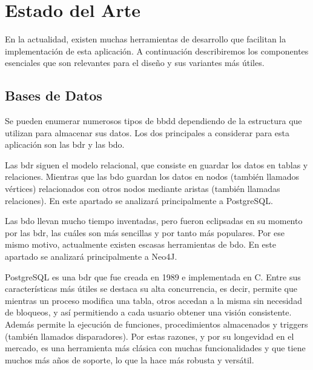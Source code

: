   
\chapter{Estado del Arte\label{CAP:ESTADOARTE}}
  En la actualidad, existen muchas herramientas de desarrollo que facilitan la implementación de esta aplicación. A continuación describiremos los componentes esenciales que son relevantes para el diseño y sus variantes más útiles.
  
  \section{Bases de Datos}
    Se pueden enumerar numerosos tipos de \ac{bbdd} dependiendo de la estructura que utilizan para almacenar sus datos. Los dos principales a considerar para esta aplicación son las \ac{bdr} y las \ac{bdo}.
    
    Las \ac{bdr} siguen el modelo relacional, que consiste en guardar los datos en tablas y relaciones. Mientras que las \ac{bdo} guardan los datos en nodos (también llamados vértices) relacionados con otros nodos mediante aristas (también llamadas relaciones). En este apartado se analizará principalmente a PostgreSQL\cite{postgres}.
    
    Las \ac{bdo} llevan mucho tiempo inventadas, pero fueron eclipsadas en su momento por las \ac{bdr}, las cuáles son más sencillas y por tanto más populares. Por ese mismo motivo, actualmente existen escasas herramientas de \ac{bdo}. En este apartado se analizará principalmente a Neo4J\cite{neo4j}.
    
    PostgreSQL es una \ac{bdr} que fue creada en 1989 e implementada en C. Entre sus características más útiles se destaca su alta concurrencia, es decir, permite que mientras un proceso modifica una tabla, otros accedan a la misma sin necesidad de bloqueos, y así permitiendo a cada usuario obtener una visión consistente. Además permite la ejecución de funciones, procedimientos almacenados y triggers (también llamados disparadores).
    Por estas razones, y por su longevidad en el mercado, es una herramienta más clásica con muchas funcionalidades y que tiene muchos más años de soporte, lo que la hace más robusta y versátil.
  

